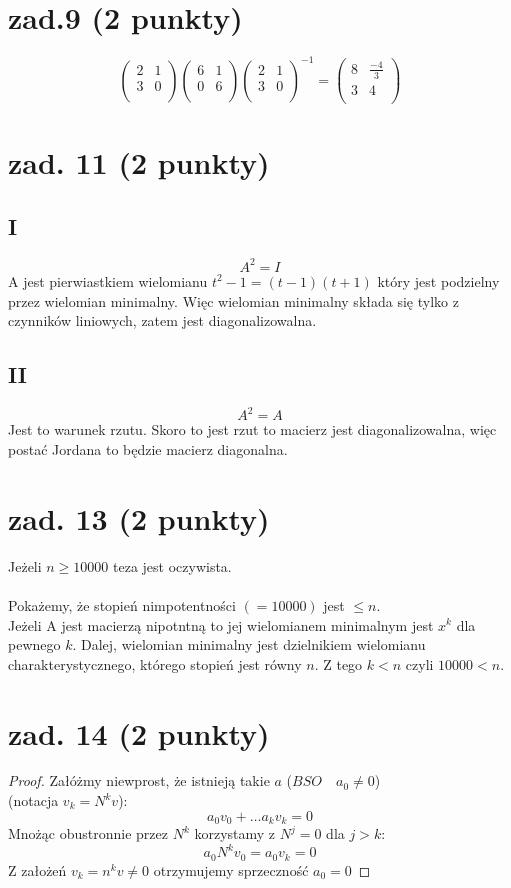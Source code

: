 \documentclass{article}
\begin{document}
\section{zad.9 (2 punkty)}
$$
\begin{pmatrix}
 2 & 1\\
 3 & 0\\
\end{pmatrix}
\begin{pmatrix}
 6 & 1\\
 0 & 6\\
\end{pmatrix}
\begin{pmatrix}
 2 & 1\\
 3 & 0\\
\end{pmatrix}^{-1}
=
\begin{pmatrix}
 8 & \frac{-4}{3}\\
 3 & 4\\
\end{pmatrix}
$$
\section{zad. 11 (2 punkty)}
\subsection*{I}
$$
A^2 = I
$$
A jest pierwiastkiem wielomianu $t^2 - 1 = (t-1)(t+1)$ który jest podzielny przez wielomian minimalny. Więc wielomian minimalny składa się tylko z czynników liniowych, zatem jest diagonalizowalna.
\subsection*{II}
$$
A^2 = A
$$
Jest to warunek rzutu. Skoro to jest rzut to macierz jest diagonalizowalna, więc postać Jordana to będzie macierz diagonalna.
\section{zad. 13 (2 punkty)}
Jeżeli $n \geq 10000$ teza jest oczywista.\\\\
Pokażemy, że stopień nimpotentności $(= 10000)$ jest $\leq n$.\\
Jeżeli A jest macierzą nipotntną to jej wielomianem minimalnym jest $x^k$ dla pewnego $k$. Dalej, wielomian minimalny jest dzielnikiem wielomianu charakterystycznego, którego stopień jest równy $n$. Z tego $k < n$ czyli $10000 < n$.
\section{zad. 14 (2 punkty)}
\begin{proof}
Załóżmy niewprost, że istnieją takie $a$ ($BSO \quad a_0 \neq 0$) \\(notacja $v_k = N^kv$):
$$
a_0v_0 + \dots a_k v_k = 0
$$
Mnożąc obustronnie przez  $N^{k}$ korzystamy z $N^j = 0$ dla $j > k$:
$$
a_0 N^{k} v_0 = a_0v_k = 0
$$
Z założeń $v_k = n^kv \neq 0$ otrzymujemy sprzeczność $a_0 = 0$
\end{proof}
\end{document}

